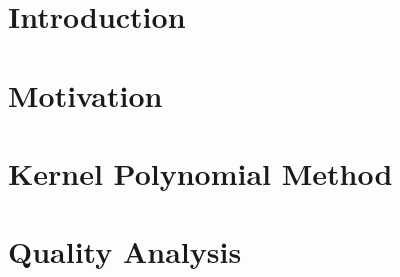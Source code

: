 \documentclass[11pt, a4paper]{report}
\theoremstyle{mydefinition}
\newcommand{\1}{\mathds{1}}
\begin{document}




\tableofcontents

\chapter{Introduction}


\chapter{Motivation}


\chapter{Kernel Polynomial Method}


\chapter{Quality Analysis}



    
\end{document}
